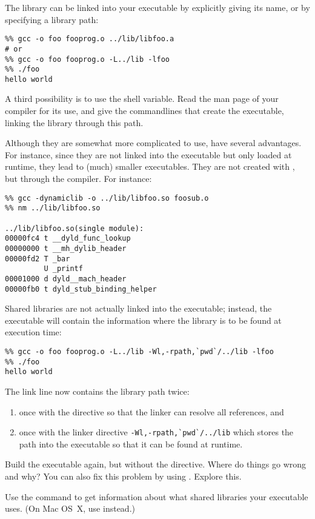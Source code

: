 The library can be linked into your executable by explicitly giving
its name, or by specifying a library path:
\begin{verbatim}
%% gcc -o foo fooprog.o ../lib/libfoo.a
# or
%% gcc -o foo fooprog.o -L../lib -lfoo
%% ./foo
hello world
\end{verbatim}
A third possibility is to use the  shell
variable. Read the man page of your compiler for its use, and give the
commandlines that create the  executable, linking the library
through this path.
 
Although they are somewhat more complicated to use, 
have several advantages. For
instance, since they are not linked into the executable but only
loaded at runtime, they lead to (much) smaller executables. They are
not created with , but through the compiler. For instance:
\begin{verbatim}
%% gcc -dynamiclib -o ../lib/libfoo.so foosub.o
%% nm ../lib/libfoo.so 

../lib/libfoo.so(single module):
00000fc4 t __dyld_func_lookup
00000000 t __mh_dylib_header
00000fd2 T _bar
         U _printf
00001000 d dyld__mach_header
00000fb0 t dyld_stub_binding_helper
\end{verbatim}
Shared libraries are not actually linked into the executable;
instead, the executable will contain the information where the library
is to be found at execution time:
\begin{verbatim}
%% gcc -o foo fooprog.o -L../lib -Wl,-rpath,`pwd`/../lib -lfoo
%% ./foo
hello world
\end{verbatim}
The link line now contains the library path twice:
\begin{enumerate}
\item once with the  directive so that the linker can resolve
  all references, and
\item once with the linker directive \verb+-Wl,-rpath,`pwd`/../lib+ which
  stores the path into the executable so that it can be found at runtime.
\end{enumerate}
Build the executable again, but without the  directive. Where
do things go wrong and why? You can also fix this problem by using
. Explore this.

Use the command  to get information about what shared libraries
your executable uses. (On Mac OS~X, use  instead.)



